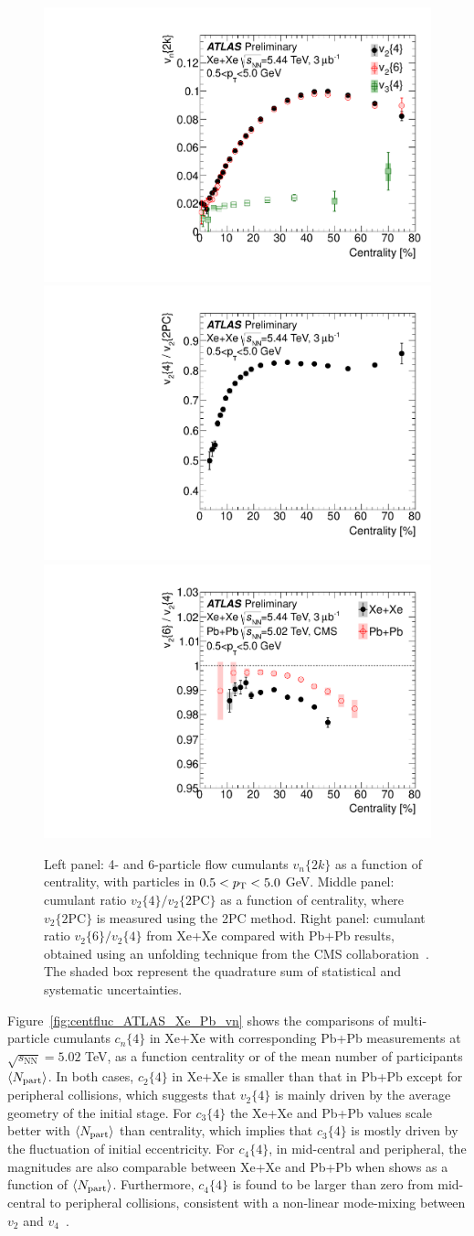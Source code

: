 \begin{figure}[H]
\centering
\includegraphics[width=.32\linewidth]{figs/chapter_centfluc/ATLAS_Xe_cn.pdf}
\includegraphics[width=.32\linewidth]{figs/chapter_centfluc/ATLAS_Xe_v42_ratio.pdf}
\includegraphics[width=.32\linewidth]{figs/chapter_centfluc/ATLAS_Xe_v64_ratio.pdf}
\caption{Left panel: 4- and 6-particle flow cumulants $v_n\{2k\}$ as a function of centrality, with particles in $0.5<p_\text{T}<5.0$ GeV. Middle panel: cumulant ratio $v_2\{4\} / v_2\{\text{2PC}\}$ as a function of centrality, where $v_2\{\text{2PC}\}$ is measured using the 2PC method. Right panel: cumulant ratio $v_2\{6\} / v_2\{4\}$ from Xe+Xe compared with Pb+Pb results, obtained using an unfolding technique from the CMS collaboration~\cite{Sirunyan:2017fts}. The shaded box represent the quadrature sum of statistical and systematic uncertainties.}
\label{fig:centfluc_ATLAS_Xe_cn}
\end{figure}

Figure~\ref{fig:centfluc_ATLAS_Xe_Pb_vn} shows the comparisons of multi-particle cumulants $c_n\{4\}$ in Xe+Xe with corresponding Pb+Pb measurements at $\sqrt{s_\text{NN}}=5.02$ TeV, as a function centrality or of the mean number of participants $\left\langle N_\text{part}\right\rangle$. In both cases, $c_2\{4\}$ in Xe+Xe is smaller than that in Pb+Pb except for peripheral collisions, which suggests that $v_2\{4\}$ is mainly driven by the average geometry of the initial stage. For $c_3\{4\}$ the Xe+Xe and Pb+Pb values scale better with $\left\langle N_\text{part}\right\rangle$ than centrality, which implies that $c_3\{4\}$ is mostly driven by the fluctuation of initial eccentricity. For $c_4\{4\}$, in mid-central and peripheral, the magnitudes are also comparable between Xe+Xe and Pb+Pb when shows as a function of $\left\langle N_\text{part}\right\rangle$. Furthermore, $c_4\{4\}$ is found to be larger than zero from mid-central to peripheral collisions, consistent with a non-linear mode-mixing between $v_2$ and $v_4$~\cite{Giacalone:2016mdr}.

